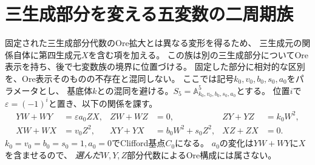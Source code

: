\section{三生成部分を変える五変数の二周期族}\label{sec:nonore}
固定された三生成部分代数のOre拡大とは異なる変形を得るため、
三生成元の関係自体に第四生成元$X$を含む項を加える。
この族は別の三生成部分についてOre表示を持ち、後で七変数族の境界に位置づける。
固定した部分に相対的な区別を、Ore表示そのものの不存在と混同しない。
ここでは記号$k_0,v_0,b_0,s_0,a_0$をパラメータとし、
基底体$k$との混同を避ける。$S_5=\mathbb A^5_{k_0,v_0,b_0,s_0,a_0}$とする。
位置$i$で$\varepsilon=(-1)^i$と置き、以下の関係を課す。
\begin{equation}\label{eq:nonore-five}
\begin{aligned}
 YW+WY&=\varepsilon a_0ZX,& ZW+WZ&=0,& ZY+YZ&=k_0W^2,\\
 XW+WX&=v_0Z^2,& XY+YX&=b_0W^2+s_0Z^2,& XZ+ZX&=0.
\end{aligned}
\end{equation}
$k_0=v_0=b_0=s_0=1,a_0=0$でClifford基点$C_0$になる。
$a_0$の変化は$YW+WY$に$X$を含ませるので、
\emph{選んだ}$W,Y,Z$部分代数によるOre構成には属さない。

